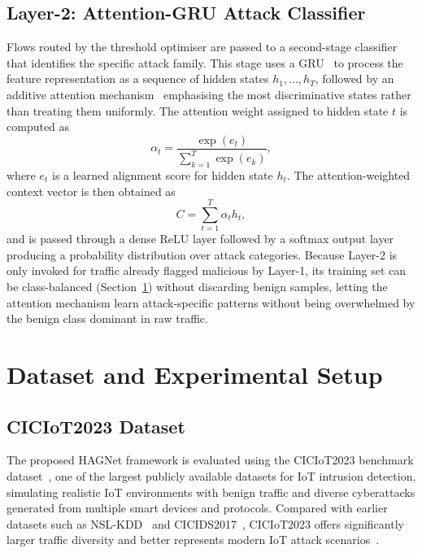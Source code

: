 \documentclass{llncs}
\begin{document}
\subsection{Layer-2: Attention-GRU Attack Classifier}

Flows routed by the threshold optimiser are passed to a second-stage classifier that identifies the specific attack family. This stage uses a GRU~\cite{ref12} to process the feature representation as a sequence of hidden states $h_1, \ldots, h_T$, followed by an additive attention mechanism~\cite{ref13} emphasising the most discriminative states rather than treating them uniformly. The attention weight assigned to hidden state $t$ is computed as
\begin{equation}
\alpha_t = \frac{\exp(e_t)}{\sum_{k=1}^{T} \exp(e_k)},
\label{eq:attention}
\end{equation}
where $e_t$ is a learned alignment score for hidden state $h_t$. The attention-weighted context vector is then obtained as
\begin{equation}
C = \sum_{t=1}^{T} \alpha_t h_t,
\label{eq:context}
\end{equation}
and is passed through a dense ReLU layer followed by a softmax output layer producing a probability distribution over attack categories. Because Layer-2 is only invoked for traffic already flagged malicious by Layer-1, its training set can be class-balanced (Section~\ref{sec:dataset}) without discarding benign samples, letting the attention mechanism learn attack-specific patterns without being overwhelmed by the benign class dominant in raw traffic.

\section{Dataset and Experimental Setup}
\label{sec:dataset}

\subsection{CICIoT2023 Dataset}

The proposed HAGNet framework is evaluated using the CICIoT2023 benchmark dataset~\cite{ref11}, one of the largest publicly available datasets for IoT intrusion detection, simulating realistic IoT environments with benign traffic and diverse cyberattacks generated from multiple smart devices and protocols. Compared with earlier datasets such as NSL-KDD~\cite{ref17} and CICIDS2017~\cite{ref18}, CICIoT2023 offers significantly larger traffic diversity and better represents modern IoT attack scenarios~\cite{ref9,ref10}.
\end{document}
